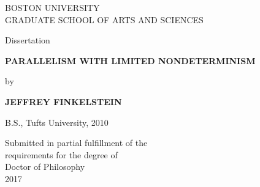 \makeatletter
\renewenvironment{titlepage}
 {%
  \@restonecolfalse\newpage
  \thispagestyle{empty}%
  \begin{center}%
 }
 {%
  \end{center}%
  \newpage
 }
\makeatother

\begin{titlepage}

  \uppercase{Boston University}\\
  \uppercase{Graduate School of Arts and Sciences}

  \vspace{8ex}

  Dissertation

  \vspace{10ex}

  \textbf{\uppercase{Parallelism with limited nondeterminism}}

  \vspace{10ex}

  by

  \vspace{8ex}

  \textbf{\uppercase{Jeffrey Finkelstein}}

  \vspace{5ex}
  B.S., Tufts University, 2010

  \vspace{22ex}

  Submitted in partial fulfillment of the\\
  requirements for the degree of\\
  Doctor of Philosophy\\
  2017
\end{titlepage}
